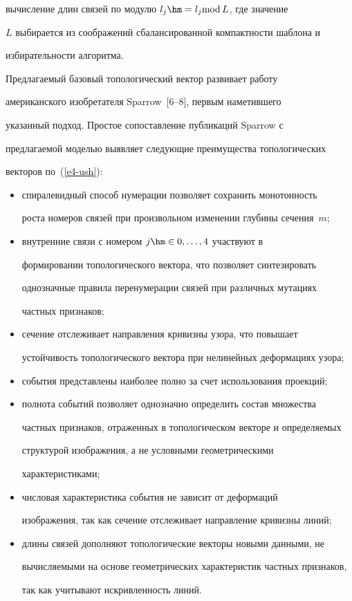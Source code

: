 вычисление длин связей по модулю $l_j\hm=l_j\mathrm{mod}\,L$, где значение 


$L$ выбирается из соображений сбалансированной компактности шаблона и 


избирательности алгоритма.


  


  Предлагаемый базовый топологический вектор развивает работу 


американского изобретателя Sparrow~[6--8], первым наметившего 


указанный подход. Простое сопоставление публикаций Sparrow с 


предлагаемой моделью выявляет следующие преимущества топологических 


векторов по~(\ref{e4-ush}):


  \begin{itemize}


\item спиралевидный способ нумерации позволяет сохранить монотонность 


роста номеров связей при произвольном изменении глубины сечения~$m$;


\item внутренние связи с номером $j\hm\in 0,\ldots , 4$ участвуют в 


формировании топологического вектора, что позволяет синтезировать 


однозначные правила перенумерации связей при различных мутациях 


частных признаков;


\item  сечение отслеживает направления кривизны узора, что повышает 


устойчивость топологического вектора при нелинейных деформациях узора;


\item  события представлены наиболее полно за счет использования проекций;


\item  полнота событий позволяет однозначно определить состав множества 


частных признаков, отраженных в топологическом векторе и определяемых 


структурой изображения, а не условными геометрическими 


характеристиками;


\item числовая характеристика события не зависит от деформаций 


изображения, так как сечение отслеживает направление кривизны линий;


\item длины связей дополняют топологические векторы новыми данными, не 


вы\-чис\-ля\-емы\-ми на основе геометрических характеристик частных признаков, 


так как учитывают искривленность линий.


\end{itemize}








